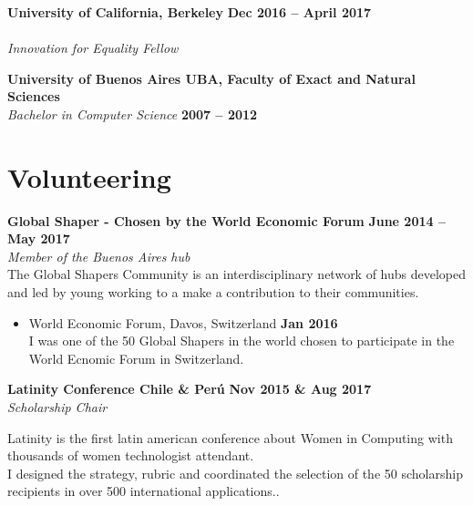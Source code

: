 \documentclass[margin,line]{resume}
\begin{document}
\begin{resume}
\textbf{University of California, Berkeley} \hfill \textbf{Dec 2016 -- April 2017}\vspace{-3mm}\\\vspace{-1mm}
\\
\textsl{Innovation for Equality Fellow} 


\textbf{University of Buenos Aires UBA, Faculty of Exact and Natural Sciences} \vspace{2mm}\\\vspace{1mm}
\textsl{Bachelor in Computer Science} \hfill \textbf{2007 -- 2012}\vspace{-3mm}\\\vspace{-1mm}


\section{\mysidestyle Volunteering}



\textbf{Global Shaper - Chosen by the World Economic Forum} \hfill \textbf{June 2014 -- May 2017} \vspace{2mm}\\\vspace{1mm}
\textsl{Member of the Buenos Aires hub} \\
The Global Shapers Community is an interdisciplinary network of hubs developed and led by young working to a make a contribution to their communities.

\begin{itemize}
\item  World Economic Forum, Davos, Switzerland \hfill \textbf{Jan 2016} \vspace{2mm} \\
I was one of the 50 Global Shapers in the world chosen to participate in the World Ecnomic Forum in Switzerland.
\end{itemize}

\textbf{Latinity Conference Chile \& Per\'u } \hfill 
 \hfill \textbf{Nov 2015 \& Aug 2017} \vspace{2mm}\\\vspace{1mm}
 \textsl{Scholarship Chair } 

Latinity is the first latin american conference about Women in Computing with thousands of women technologist attendant.\\
I designed the strategy, rubric and coordinated the selection of the 50 scholarship recipients in over 500 international applications..


\end{resume}
\end{document}
